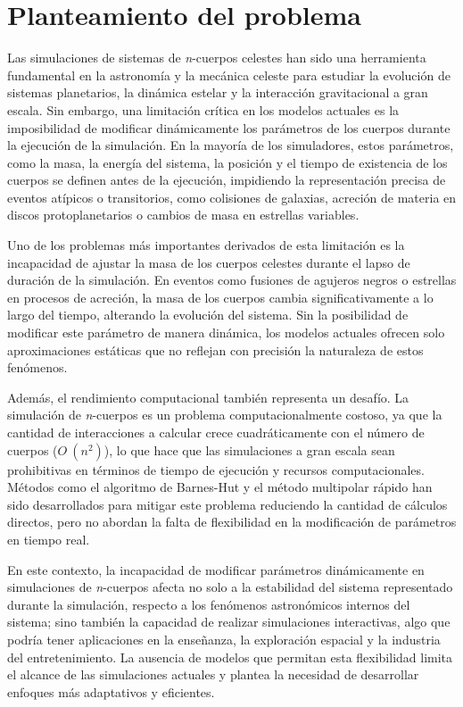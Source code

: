 \section{Planteamiento del problema}
Las simulaciones de sistemas de \textit{n}-cuerpos celestes han sido una herramienta fundamental en la astronomía y la mecánica celeste para estudiar la evolución de sistemas planetarios, la dinámica estelar y la interacción gravitacional a gran escala. Sin embargo, una limitación crítica en los modelos actuales es la imposibilidad de modificar dinámicamente los parámetros de los cuerpos durante la ejecución de la simulación. En la mayoría de los simuladores, estos parámetros, como la masa, la energía del sistema, la posición y el tiempo de existencia de los cuerpos se definen antes de la ejecución, impidiendo la representación precisa de eventos atípicos o transitorios, como colisiones de galaxias, acreción de materia en discos protoplanetarios o cambios de masa en estrellas variables.

Uno de los problemas más importantes derivados de esta limitación es la incapacidad de ajustar la masa de los cuerpos celestes durante el lapso de duración de la simulación. En eventos como fusiones de agujeros negros o estrellas en procesos de acreción, la masa de los cuerpos cambia significativamente a lo largo del tiempo, alterando la evolución del sistema. Sin la posibilidad de modificar este parámetro de manera dinámica, los modelos actuales ofrecen solo aproximaciones estáticas que no reflejan con precisión la naturaleza de estos fenómenos.

Además, el rendimiento computacional también representa un desafío. La simulación de \textit{n}-cuerpos es un problema computacionalmente costoso, ya que la cantidad de interacciones a calcular crece cuadráticamente con el número de cuerpos ($O~(n^2)$), lo que hace que las simulaciones a gran escala sean prohibitivas en términos de tiempo de ejecución y recursos computacionales. Métodos como el algoritmo de Barnes-Hut y el método multipolar rápido han sido desarrollados para mitigar este problema reduciendo la cantidad de cálculos directos, pero no abordan la falta de flexibilidad en la modificación de parámetros en tiempo real.

En este contexto, la incapacidad de modificar parámetros dinámicamente en simulaciones de \textit{n}-cuerpos afecta no solo a la estabilidad del sistema representado durante la simulación, respecto a los fenómenos astronómicos internos del sistema; sino también la capacidad de realizar simulaciones interactivas, algo que podría tener aplicaciones en la enseñanza, la exploración espacial y la industria del entretenimiento. La ausencia de modelos que permitan esta flexibilidad limita el alcance de las simulaciones actuales y plantea la necesidad de desarrollar enfoques más adaptativos y eficientes.